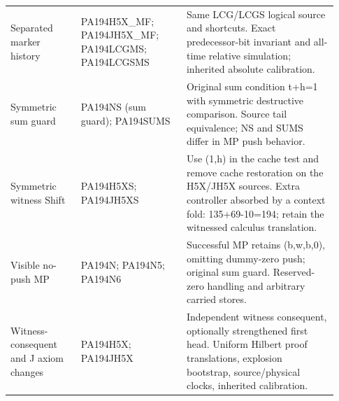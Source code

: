 \begin{longtable}{p{0.20\linewidth}p{0.30\linewidth}p{0.43\linewidth}}
Separated marker history & PA194H5X\_MF; PA194JH5X\_MF; PA194LCGMS; PA194LCGSMS & Same LCG/LCGS logical source and shortcuts. Exact predecessor-bit invariant and all-time relative simulation; inherited absolute calibration.\\[4pt]
Symmetric sum guard & PA194NS (sum guard); PA194SUMS & Original sum condition t+h=1 with symmetric destructive comparison. Source tail equivalence; NS and SUMS differ in MP push behavior.\\[4pt]
Symmetric witness Shift & PA194H5XS; PA194JH5XS & Use (1,h) in the cache test and remove cache restoration on the H5X/JH5X sources. Extra controller absorbed by a context fold: 135+69-10=194; retain the witnessed calculus translation.\\[4pt]
Visible no-push MP & PA194N; PA194N5; PA194N6 & Successful MP retains (b,w,b,0), omitting dummy-zero push; original sum guard. Reserved-zero handling and arbitrary carried stores.\\[4pt]
Witness-consequent and J axiom changes & PA194H5X; PA194JH5X & Independent witness consequent, optionally strengthened first head. Uniform Hilbert proof translations, explosion bootstrap, source/physical clocks, inherited calibration.\\[4pt]
\end{longtable}
\endgroup
